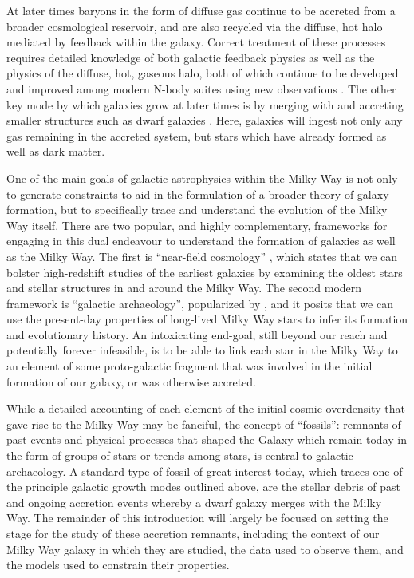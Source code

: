 At later times baryons in the form of diffuse gas continue to be accreted from a broader cosmological reservoir, and are also recycled via the diffuse, hot halo mediated by feedback within the galaxy. Correct treatment of these processes requires detailed knowledge of both galactic feedback physics as well as the physics of the diffuse, hot, gaseous halo, both of which continue to be developed and improved among modern N-body suites using new observations \parencite[e.g.][]{crain23}. The other key mode by which galaxies grow at later times is by merging with and accreting smaller structures such as dwarf galaxies \parencite{lacey93}. Here, galaxies will ingest not only any gas remaining in the accreted system, but stars which have already formed as well as dark matter.

One of the main goals of galactic astrophysics within the Milky Way is not only to generate constraints to aid in the formulation of a broader theory of galaxy formation, but to specifically trace and understand the evolution of the Milky Way itself. There are two popular, and highly complementary, frameworks for engaging in this dual endeavour to understand the formation of galaxies as well as the Milky Way. The first is ``near-field cosmology'' \parencite{bland-hawthorn99,frebel15}, which states that we can bolster high-redshift studies of the earliest galaxies by examining the oldest stars and stellar structures in and around the Milky Way. The second modern framework is ``galactic archaeology'', popularized by \textcite{freeman02}, and it posits that we can use the present-day properties of long-lived Milky Way stars to infer its formation and evolutionary history. An intoxicating end-goal, still beyond our reach and potentially forever infeasible, is to be able to link each star in the Milky Way to an element of some proto-galactic fragment that was involved in the initial formation of our galaxy, or was otherwise accreted.

While a detailed accounting of each element of the initial cosmic overdensity that gave rise to the Milky Way may be fanciful, the concept of ``fossils'': remnants of past events and physical processes that shaped the Galaxy which remain today in the form of groups of stars or trends among stars, is central to galactic archaeology. A standard type of fossil of great interest today, which traces one of the principle galactic growth modes outlined above, are the stellar debris of past and ongoing accretion events whereby a dwarf galaxy merges with the Milky Way. The remainder of this introduction will largely be focused on setting the stage for the study of these accretion remnants, including the context of our Milky Way galaxy in which they are studied, the data used to observe them, and the models used to constrain their properties.